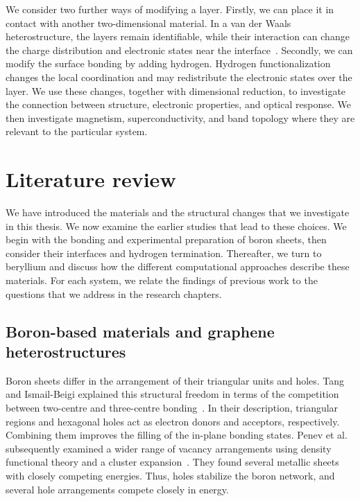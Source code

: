 We consider two further ways of modifying a layer.
Firstly, we can place it in contact with another two-dimensional material.
In a van der Waals heterostructure, the layers remain identifiable, while their interaction can change the charge distribution and electronic states near the interface~\cite{novoselov20162d}.
Secondly, we can modify the surface bonding by adding hydrogen.
Hydrogen functionalization changes the local coordination and may redistribute the electronic states over the layer.
We use these changes, together with dimensional reduction, to investigate the connection between structure, electronic properties, and optical response.
We then investigate magnetism, superconductivity, and band topology where they are relevant to the particular system.

\section{Literature review}
\label{sec:intro_lit_review}

We have introduced the materials and the structural changes that we investigate in this thesis.
We now examine the earlier studies that lead to these choices.
We begin with the bonding and experimental preparation of boron sheets, then consider their interfaces and hydrogen termination.
Thereafter, we turn to beryllium and discuss how the different computational approaches describe these materials.
For each system, we relate the findings of previous work to the questions that we address in the research chapters.

\subsection{Boron-based materials and graphene heterostructures}
\label{subsec:lit_boron}

Boron sheets differ in the arrangement of their triangular units and holes.
Tang and Ismail-Beigi explained this structural freedom in terms of the competition between two-centre and three-centre bonding~\cite{tang2007novel}.
In their description, triangular regions and hexagonal holes act as electron donors and acceptors, respectively.
Combining them improves the filling of the in-plane bonding states.
Penev et al. subsequently examined a wider range of vacancy arrangements using density functional theory and a cluster expansion~\cite{penev2012polymorphism}.
They found several metallic sheets with closely competing energies.
Thus, holes stabilize the boron network,
and several hole arrangements compete closely in energy.


